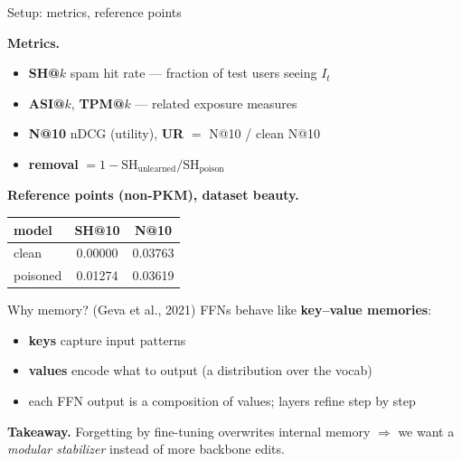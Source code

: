 \documentclass{beamer}
\newcommand{\If}{\ensuremath{I_t}}      %
\begin{document}
\begin{frame}{Setup: metrics, reference points}
    
\textbf{Metrics.}
\begin{itemize}
  \item \textbf{SH@$k$} spam hit rate --- fraction of test users seeing \If{}
  \item \textbf{ASI@$k$}, \textbf{TPM@$k$} --- related exposure measures
  \item \textbf{N@10} nDCG (utility), \textbf{UR} $=$ N@10 / clean N@10
  \item \textbf{removal} $= 1 - \text{SH}_{\text{unlearned}}/\text{SH}_{\text{poison}}$
\end{itemize}

\textbf{Reference points (non-PKM), dataset beauty.}
\begin{center}
\begin{tabular}{|l|c|c|}
\hline
model & SH@10 & N@10 \\
\hline
clean            & 0.00000 & 0.03763 \\
poisoned         & 0.01274 & 0.03619 \\
\hline
\end{tabular}
\end{center}
\end{frame}

\begin{frame}{Why memory? (Geva et al., 2021)}
FFNs behave like \textbf{key--value memories}:
\begin{itemize}
  \item \textbf{keys} capture input patterns
  \item \textbf{values} encode what to output (a distribution over the vocab)
  \item each FFN output is a composition of values; layers refine step by step
\end{itemize}

\medskip
\textbf{Takeaway.} Forgetting by fine-tuning overwrites internal memory
$\Rightarrow$ we want a \emph{modular stabilizer} instead of more backbone edits.

\end{frame}

\end{document}
